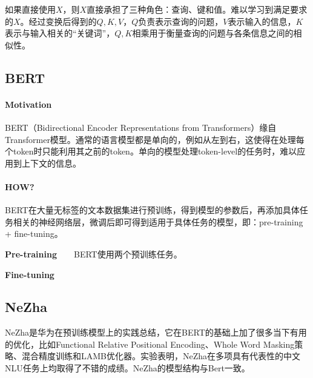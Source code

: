 如果直接使用$X$，则$X$直接承担了三种角色：查询、键和值。难以学习到满足要求的$X$。经过变换后得到的$Q, K, V$，$Q$负责表示查询的问题，$V$表示输入的信息，$K$表示与输入相关的“关键词”，$Q, K$相乘用于衡量查询的问题与各条信息之间的相似性。

\subsection{BERT}
\paragraph{Motivation}
BERT（Bidirectional Encoder Representations from Transformers）\cite{devlin2019bert}缘自Transformer模型。通常的语言模型都是单向的，例如从左到右，这使得在处理每个token时只能利用其之前的token。单向的模型处理token-level的任务时，难以应用到上下文的信息。

\paragraph{HOW?}
BERT在大量无标签的文本数据集进行预训练，得到模型的参数后，再添加具体任务相关的神经网络层，微调后即可得到适用于具体任务的模型，即：pre-training + fine-tuning。

\par{\textbf{Pre-training}}\ \ \ \ BERT使用两个预训练任务。

\par{\textbf{Fine-tuning}}


\subsection{NeZha}
NeZha\cite{junqiu2019nezha}是华为在预训练模型上的实践总结，它在BERT的基础上加了很多当下有用的优化，比如Functional Relative Positional Encoding、Whole Word Masking策略、混合精度训练和LAMB优化器。实验表明，NeZha在多项具有代表性的中文NLU任务上均取得了不错的成绩。NeZha的模型结构与Bert一致。
